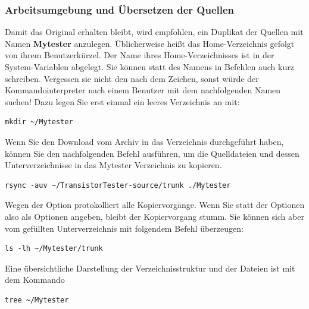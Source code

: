 \subsubsection{Arbeitsumgebung und Übersetzen der Quellen}
\label{sec:Arbeitsumgebung}
Damit das Original erhalten bleibt,
wird empfohlen, ein Duplikat der Quellen mit Namen \textbf {Mytester} anzulegen.
Üblicherweise heißt das Home-Verzeichnis  gefolgt von ihrem Benutzerkürzel.
Der Name ihres Home-Verzeichnisses ist in der System-Variablen  abgelegt.
Sie können statt des Namens in Befehlen auch kurz \lname{\textasciitilde/} schreiben.
Vergessen sie nicht den \lname{/} nach dem \lname{\textasciitilde} Zeichen, sonst würde der
Kommandointerpreter nach einem Benutzer mit dem nachfolgenden Namen suchen!
Dazu legen Sie erst einmal ein leeres Verzeichnis an mit:
\begin{large} \vspace{-0.4em} \begin{verbatim}
mkdir ~/Mytester
\end{verbatim} \end{large}
 \vspace{-0.5em} 
Wenn Sie den Download vom Archiv in das Verzeichnis   durchgeführt haben,
können Sie den nachfolgenden Befehl ausführen, um die Quelldateien und dessen Unterverzeichnisse
in das Mytester Verzeichnis zu kopieren.
\begin{large} \vspace{-0.4em} \begin{verbatim}
rsync -auv ~/TransistorTester-source/trunk ./Mytester
\end{verbatim} \end{large}
 \vspace{-0.5em} 
Wegen der  Option protokolliert  alle Kopiervorgänge.
Wenn Sie statt der  Optionen also  als Optionen angeben,
bleibt der Kopiervorgang stumm.
Sie können sich aber vom gefüllten Unterverzeichnis mit folgendem Befehl
überzeugen:
\begin{large} \vspace{-0.4em} \begin{verbatim}
ls -lh ~/Mytester/trunk
\end{verbatim} \end{large}
 \vspace{-0.5em} 
Eine übersichtliche Darstellung der Verzeichnisstruktur und der Dateien ist mit dem Kommando
\begin{large} \vspace{-0.4em} \begin{verbatim}
tree ~/Mytester
\end{verbatim} \end{large}
